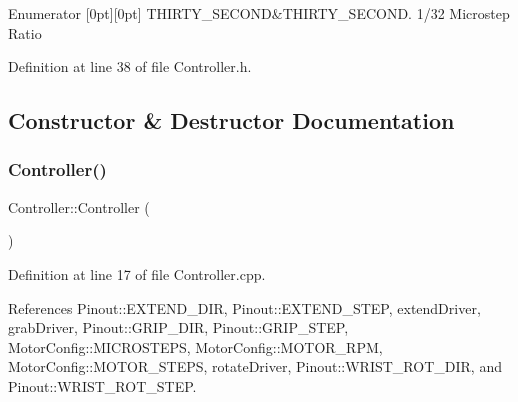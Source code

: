 \begin{DoxyEnumFields}{Enumerator}
[0pt][0pt]{}\mbox{\label{class_controller_aa94f1aea40982c422a43c1ee5aea0c49aad17f41f310f462eb36ac9f6bac29b57}} 
T\+H\+I\+R\+T\+Y\+\_\+\+S\+E\+C\+O\+ND&T\+H\+I\+R\+T\+Y\+\_\+\+S\+E\+C\+O\+ND. 1/32 Microstep Ratio \\
\hline

\end{DoxyEnumFields}


Definition at line 38 of file Controller.\+h.



\subsection{Constructor \& Destructor Documentation}
\mbox{\label{class_controller_a95c56822d667e94b031451729ce069a9}} 
\subsubsection{\texorpdfstring{Controller()}{Controller()}}
{\footnotesize\ttfamily Controller\+::\+Controller (\begin{DoxyParamCaption}{ }\end{DoxyParamCaption})}



Definition at line 17 of file Controller.\+cpp.



References Pinout\+::\+E\+X\+T\+E\+N\+D\+\_\+\+D\+IR, Pinout\+::\+E\+X\+T\+E\+N\+D\+\_\+\+S\+T\+EP, extend\+Driver, grab\+Driver, Pinout\+::\+G\+R\+I\+P\+\_\+\+D\+IR, Pinout\+::\+G\+R\+I\+P\+\_\+\+S\+T\+EP, Motor\+Config\+::\+M\+I\+C\+R\+O\+S\+T\+E\+PS, Motor\+Config\+::\+M\+O\+T\+O\+R\+\_\+\+R\+PM, Motor\+Config\+::\+M\+O\+T\+O\+R\+\_\+\+S\+T\+E\+PS, rotate\+Driver, Pinout\+::\+W\+R\+I\+S\+T\+\_\+\+R\+O\+T\+\_\+\+D\+IR, and Pinout\+::\+W\+R\+I\+S\+T\+\_\+\+R\+O\+T\+\_\+\+S\+T\+EP.

\mbox{\label{class_controller_a0ab87934c4f7a266cfdb86e0f36bc1b5}} 
